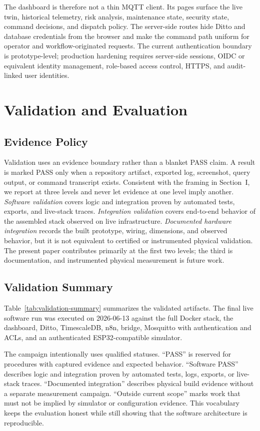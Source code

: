 \documentclass[journal]{IEEEtran}
\begin{document}
The dashboard is therefore not a thin MQTT client. Its pages surface the live twin, historical telemetry, risk analysis, maintenance state, security state, command decisions, and dispatch policy. The server-side routes hide Ditto and database credentials from the browser and make the command path uniform for operator and workflow-originated requests. The current authentication boundary is prototype-level; production hardening requires server-side sessions, OIDC or equivalent identity management, role-based access control, HTTPS, and audit-linked user identities.

\section{Validation and Evaluation}
\label{sec:eval}

\subsection{Evidence Policy}

Validation uses an evidence boundary rather than a blanket PASS claim. A result is marked PASS only when a repository artifact, exported log, screenshot, query output, or command transcript exists. Consistent with the framing in Section~I, we report at three levels and never let evidence at one level imply another. \emph{Software validation} covers logic and integration proven by automated tests, exports, and live-stack traces. \emph{Integration validation} covers end-to-end behavior of the assembled stack observed on live infrastructure. \emph{Documented hardware integration} records the built prototype, wiring, dimensions, and observed behavior, but it is not equivalent to certified or instrumented physical validation. The present paper contributes primarily at the first two levels; the third is documentation, and instrumented physical measurement is future work.

\subsection{Validation Summary}

Table~\ref{tab:validation-summary} summarizes the validated artifacts. The final live software run was executed on 2026-06-13 against the full Docker stack, the dashboard, Ditto, TimescaleDB, n8n, bridge, Mosquitto with authentication and ACLs, and an authenticated ESP32-compatible simulator.

The campaign intentionally uses qualified statuses. ``PASS'' is reserved for procedures with captured evidence and expected behavior. ``Software PASS'' describes logic and integration proven by automated tests, logs, exports, or live-stack traces. ``Documented integration'' describes physical build evidence without a separate measurement campaign. ``Outside current scope'' marks work that must not be implied by simulator or configuration evidence. This vocabulary keeps the evaluation honest while still showing that the software architecture is reproducible.
\end{document}
